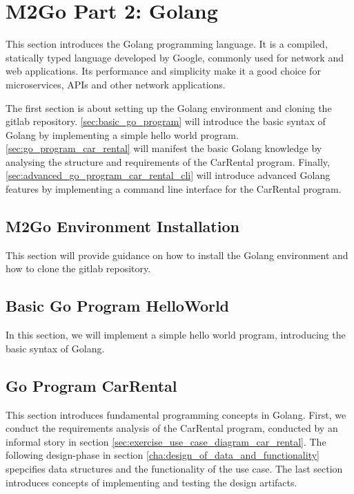 \chapter{M2Go Part 2: Golang}
\label{cha:golang}
This section introduces the Golang programming language.
It is a compiled, statically typed language developed by Google, commonly used for network and web applications.
Its performance and simplicity make it a good choice for microservices, APIs and other network applications.

The first section is about setting up the Golang environment and cloning the gitlab repository.
\autoref{sec:basic_go_program} will introduce the basic syntax of Golang by implementing a simple hello world program.
\autoref{sec:go_program_car_rental} will manifest the basic Golang knowledge by analysing the structure and requirements of the CarRental program.
Finally, \autoref{sec:advanced_go_program_car_rental_cli} will introduce advanced Golang features by implementing a command line interface for the CarRental program.


\section{M2Go Environment Installation}
\label{sec:m2go_env_installation}
This section will provide guidance on how to install the Golang environment and how to clone the gitlab repository.





\section{Basic Go Program HelloWorld}
\label{sec:basic_go_program}
In this section, we will implement a simple hello world program, introducing the basic syntax of Golang.




\section{Go Program CarRental}
\label{sec:go_program_car_rental}
This section introduces fundamental programming concepts in Golang.
First, we conduct the requirements analysis of the CarRental program, conducted by an informal story in section \ref{sec:exercise_use_case_diagram_car_rental}.
The following design-phase in section \ref{cha:design_of_data_and_functionality} spepcifies data structures and the functionality of the use case.
The last section introduces concepts of implementing and testing the design artifacts.

